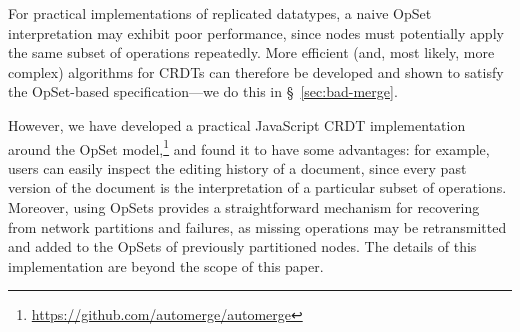 For practical implementations of replicated datatypes, a naive OpSet interpretation may exhibit poor performance, since nodes must potentially apply the same subset of operations repeatedly.
More efficient (and, most likely, more complex) algorithms for CRDTs can therefore be developed and shown to satisfy the OpSet-based specification---we do this in \S~\ref{sec:bad-merge}.

However, we have developed a practical JavaScript CRDT implementation around the OpSet model,\footnote{\url{https://github.com/automerge/automerge}} and found it to have some advantages: for example, users can easily inspect the editing history of a document, since every past version of the document is the interpretation of a particular subset of operations.
Moreover, using OpSets provides a straightforward mechanism for recovering from network partitions and failures, as missing operations may be retransmitted and added to the OpSets of previously partitioned nodes.
The details of this implementation are beyond the scope of this paper.
